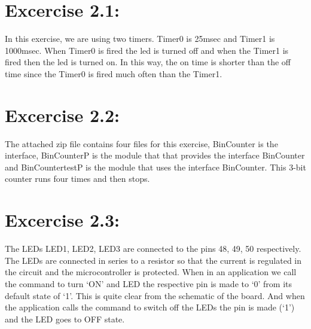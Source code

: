 \documentclass[11pt]{article} %
\begin{document}
\section*{Excercise 2.1:}
In this exercise, we are using two timers. Timer0 is 25msec and Timer1 is 1000msec. When Timer0 is fired the led is turned off and when the Timer1 is fired then the led is turned on. In this way, the on time is shorter than the off time since the Timer0 is fired much often than the Timer1.

\section*{Excercise 2.2:}
The attached zip file contains four files for this exercise, BinCounter is the interface, BinCounterP is the module that that provides the interface BinCounter and BinCountertestP is the module that uses the interface BinCounter. This 3-bit counter runs four times and then stops.

\section*{Excercise 2.3:}
The LEDs LED1, LED2, LED3 are connected to the pins 48, 49, 50 respectively. The LEDs are connected in series to a resistor so that the current is regulated in the circuit and the microcontroller is protected. When in an application we call the command to turn `ON' and LED the respective pin is made to `0' from its default state of `1'. This is quite clear from the schematic of the board. And when the application calls the command to switch off the LEDs the pin is made (`1') and the LED goes to OFF state.
\end{document}
